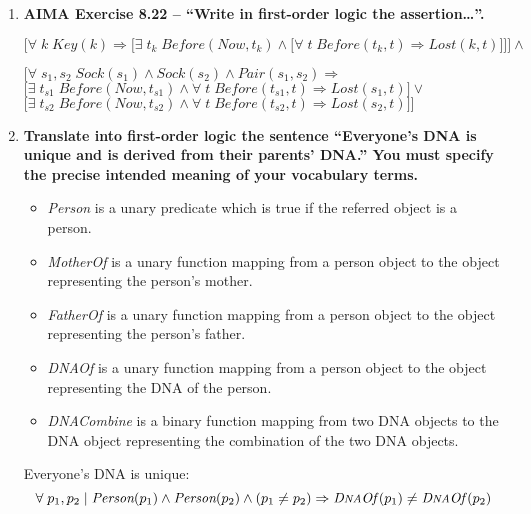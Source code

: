 \begin{enumerate}
\begin{enumerate}
\end{enumerate}

\item \textbf{AIMA Exercise 8.22 -- ``Write in first-order logic the assertion\ldots''.}

$\Bigg[ \forall \; k \; \textit{Key}(k) \Rightarrow \Big[ \exists \; t_k \; \textit{Before}(\textit{Now}, t_k) \land \big[ \forall \; t \; \textit{Before}(t_k, t) \Rightarrow \textit{Lost}(k, t) \big] \Big] \Bigg] \land$

$\Bigg[\forall \; s_1, s_2 \; \textit{Sock}(s_1) \land \textit{Sock}(s_2) \land \textit{Pair}(s_1, s_2) \Rightarrow$\\
$\big[\exists \; t_{s1} \; \textit{Before}(\textit{Now}, t_{s1}) \land \forall \; t \; \textit{Before}(t_{s1}, t) \Rightarrow \textit{Lost}(s_1, t)\big] \lor$\\
$\big[\exists \; t_{s2} \; \textit{Before}(\textit{Now}, t_{s2}) \land \forall \; t \; \textit{Before}(t_{s2}, t) \Rightarrow \textit{Lost}(s_2, t)\big]\Bigg]$

\item \textbf{Translate into first-order logic the sentence ``Everyone's DNA is unique and is derived from their parents' DNA.'' You must specify the precise intended meaning of your vocabulary terms.}

\begin{itemize}
\item \textit{Person} is a unary predicate which is true if the referred object is a person.
\item \textit{MotherOf} is a unary function mapping from a person object to the object representing the person's mother.
\item \textit{FatherOf} is a unary function mapping from a person object to the object representing the person's father.
\item \textit{D{\footnotesize NA}Of\thinspace} is a unary function mapping from a person object to the object representing the DNA of the person.
\item \textit{D{\footnotesize NA}Combine\thinspace} is a binary function mapping from two DNA objects to the DNA object representing the combination of the two DNA objects.
\end{itemize}

Everyone's DNA is unique:
\begin{displaymath}
\forall \; p_1, p_2 \; | \; \textit{Person}(p_1) \land \textit{Person}(p_2) \land (p_1 \neq p_2) \Rightarrow \textit{D{\footnotesize NA}Of\thinspace}(p_1) \neq \textit{D{\footnotesize NA}Of\thinspace}(p_2)
\end{displaymath}


\end{enumerate}
